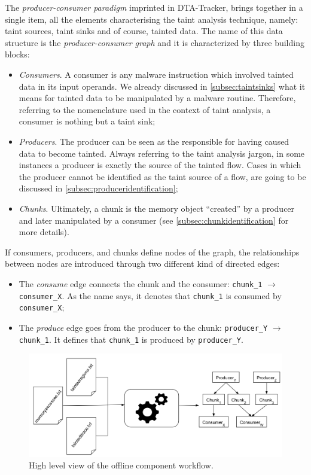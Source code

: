 \documentclass[LaM,binding=0.6cm]{sapthesis}
\begin{document}
The \textit{producer-consumer paradigm} imprinted in {\sf DTA-Tracker}, brings together in a single item, all the elements characterising the taint analysis technique, namely: taint sources, taint sinks and of course, tainted data. The name of this data structure is the \textit{producer-consumer graph} and it is characterized by three building blocks:
\begin{itemize}
\item \textit{Consumers}. A consumer is any malware instruction which involved tainted data in its input operands. We already discussed in \autoref{subsec:taintsinks} what it means for tainted data to be manipulated by a malware routine. Therefore, referring to the nomenclature used in the context of taint analysis, a consumer is nothing but a taint sink;
\item \textit{Producers}. The producer can be seen as the responsible for having caused data to become tainted. Always referring to the taint analysis jargon, in some instances a producer is exactly the source of the tainted flow. Cases in which the producer cannot be identified as the taint source of a flow, are going to be discussed in \autoref{subsec:produceridentification};
\item \textit{Chunks}. Ultimately, a chunk is the memory object ``created'' by a producer and later manipulated by a consumer (see \autoref{subsec:chunkidentification} for more details). 
\end{itemize}
If consumers, producers, and chunks define nodes of the graph, the relationships between nodes are introduced through two different kind of directed edges:
\begin{itemize}
\item The \textit{consume} edge connects the chunk and the consumer: \texttt{chunk\_1} $\rightarrow$ \texttt{consumer\_X}. As the name says, it denotes that \texttt{chunk\_1}  is consumed by \texttt{consumer\_X};
\item The \textit{produce} edge goes from the producer to the chunk: \texttt{producer\_Y} $\rightarrow$ \texttt{chunk\_1}. It defines that \texttt{chunk\_1} is produced by \texttt{producer\_Y}.
\end{itemize}

\begin{figure}[h!]
\centering
\vspace{-5mm}
\includegraphics[scale=.43]{images/dtatracker3}
\vspace{-2mm}
\caption{High level view of the offline component workflow.}
\vspace{-4mm}
\end{figure}
\end{document}
